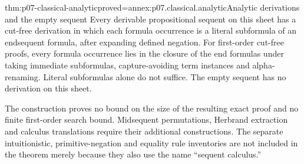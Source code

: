 \begin{hbcorollary}{thm:p07-classical-analytic}{proved=annex:p07.classical.analytic}{Analytic derivations and the empty sequent}
Every derivable propositional sequent on this sheet has a cut-free
derivation in which each formula occurrence is a literal subformula of an
endsequent formula, after expanding defined negation.
For first-order cut-free proofs, every formula occurrence lies in the
closure of the end formulas under taking immediate subformulas,
capture-avoiding term instances and alpha-renaming. Literal subformulas
alone do not suffice.
The empty sequent has no derivation on this sheet.
\end{hbcorollary}

The construction proves no bound on the size of the resulting exact proof
and no finite first-order search bound. Midsequent permutations, Herbrand
extraction and calculus translations require their additional constructions.
The separate intuitionistic, primitive-negation and equality rule inventories
are not included in the theorem merely because they also use the name
``sequent calculus.''
